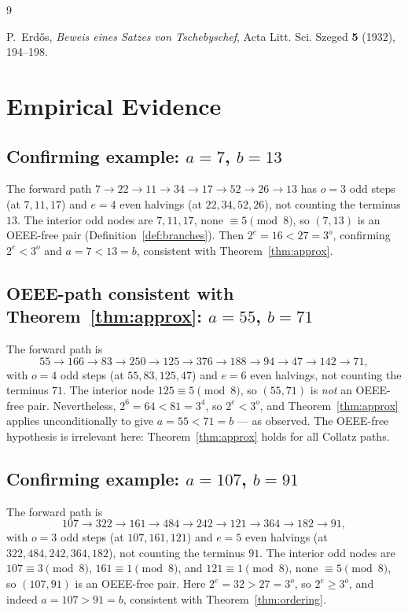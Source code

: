 \documentclass[11pt]{article}
\begin{document}
\begin{thebibliography}{9}

P.~Erd\H{o}s,
\emph{Beweis eines Satzes von Tschebyschef},
Acta Litt. Sci. Szeged \textbf{5} (1932), 194--198.

\end{thebibliography}

\appendix

\section{Empirical Evidence}
\label{app:empirical}

\subsection*{Confirming example: $a=7$, $b=13$}

The forward path $7 \to 22 \to 11 \to 34 \to 17 \to 52 \to 26 \to 13$
has $o = 3$ odd steps (at $7, 11, 17$) and $e = 4$ even halvings
(at $22, 34, 52, 26$), not counting the terminus $13$.
The interior odd nodes are $7, 11, 17$, none $\equiv 5\pmod{8}$, so
$(7, 13)$ is an OEEE-free pair (Definition~\ref{def:branches}).
Then $2^e = 16 < 27 = 3^o$, confirming $2^e < 3^o$
and $a = 7 < 13 = b$, consistent with Theorem~\ref{thm:approx}.

\subsection*{OEEE-path consistent with Theorem~\ref{thm:approx}: $a=55$, $b=71$}

The forward path is
\[
  55 \to 166 \to 83 \to 250 \to 125 \to 376 \to 188 \to 94 \to 47 \to 142 \to 71,
\]
with $o = 4$ odd steps (at $55, 83, 125, 47$) and $e = 6$ even halvings,
not counting the terminus $71$.  The interior node $125 \equiv 5\pmod{8}$,
so $(55, 71)$ is \emph{not} an OEEE-free pair.  Nevertheless,
$2^6 = 64 < 81 = 3^4$, so $2^e < 3^o$, and Theorem~\ref{thm:approx}
applies unconditionally to give $a = 55 < 71 = b$ — as observed.
The OEEE-free hypothesis is irrelevant here: Theorem~\ref{thm:approx}
holds for all Collatz paths.

\subsection*{Confirming example: $a=107$, $b=91$}

The forward path is
\[
  107 \to 322 \to 161 \to 484 \to 242 \to 121 \to 364 \to 182 \to 91,
\]
with $o = 3$ odd steps (at $107, 161, 121$) and $e = 5$ even halvings
(at $322, 484, 242, 364, 182$), not counting the terminus $91$.
The interior odd nodes are $107 \equiv 3\pmod{8}$, $161 \equiv 1\pmod{8}$,
and $121 \equiv 1\pmod{8}$, none $\equiv 5\pmod{8}$, so $(107, 91)$ is an
OEEE-free pair.  Here $2^e = 32 > 27 = 3^o$, so
$2^e \geq 3^o$, and indeed $a = 107 > 91 = b$, consistent with
Theorem~\ref{thm:ordering}.
\end{document}
